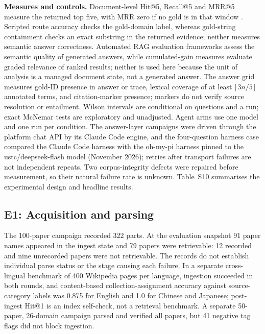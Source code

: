 \textbf{Measures and controls.} Document-level Hit@5, Recall@5 and MRR@5
measure the returned top five, with MRR zero if no gold is in that window
\cite{craswell-msmarco-2021}. Scripted route accuracy checks the gold-domain
label, whereas gold-string containment checks an exact substring in the
returned evidence; neither measures semantic answer correctness. Automated
RAG evaluation frameworks \citep{es-ragas-2024,saad-falcon-ares-2024}
assess the semantic quality of generated answers, while cumulated-gain
measures \citep{jarvelin-cumulated-gain-2002} evaluate graded relevance of
ranked results; neither is used here because the unit of analysis is a managed
document state, not a generated answer. The answer
grid measures gold-ID presence in answer or trace, lexical coverage of at
least $\lceil3n/5\rceil$ annotated terms, and citation-marker presence;
markers do not verify source resolution or entailment. Wilson intervals are
conditional on questions and a run; exact McNemar tests are exploratory and
unadjusted. Agent arms use one model and one run per condition. The
answer-layer campaigns were driven through the platform chat API by its
Claude Code engine, and the four-question harness case compared the Claude
Code harness with the oh-my-pi harness pinned to the ustc/deepseek-flash
model (November 2026); retries after transport failures are not independent
repeats. Two corpus-integrity defects
were repaired before measurement, so their natural failure rate is unknown.
Table~S10 summarises the experimental design and headline results.

\subsection{E1: Acquisition and parsing}
\label{sec:e1}
The 100-paper campaign recorded 322 parts. At the evaluation snapshot 91
paper names appeared in the ingest state and 79 papers were retrievable:
12 recorded and nine unrecorded papers were not retrievable. The records do
not establish individual parse status or the stage causing each failure. In
a separate cross-lingual benchmark of 400 Wikipedia pages per language,
ingestion succeeded in both rounds, and content-based collection-assignment
accuracy against source-category labels was 0.875 for English and 1.0 for
Chinese and Japanese; post-ingest Hit@1 is an index self-check, not a retrieval
benchmark. A separate 50-paper, 26-domain campaign parsed and verified all
papers, but 41 negative tag flags did not block ingestion.

